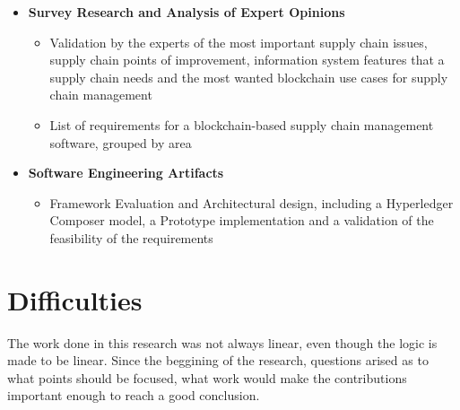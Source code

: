 \begin{itemize}
	\item \textbf{Survey Research and Analysis of Expert Opinions}
	\begin{itemize}
		\item Validation by the experts of the most important supply chain issues, supply chain points of improvement, information system features that a supply chain needs and the most wanted blockchain use cases for supply chain management
		\item List of requirements for a blockchain-based supply chain management software, grouped by area %
	\end{itemize}
	\item \textbf{Software Engineering Artifacts}
	\begin{itemize}
		\item Framework Evaluation and Architectural design, including a Hyperledger Composer model, a Prototype implementation and a validation of the feasibility of the requirements
	\end{itemize}
\end{itemize}



\section{Difficulties}

The work done in this research was not always linear, even though the logic is made to be linear. Since the beggining of the research, questions arised as to what points should be focused, what work would make the contributions important enough to reach a good conclusion. 

